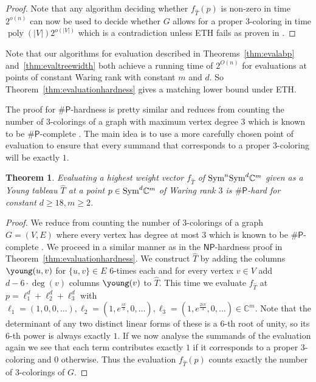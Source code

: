 \documentclass[10pt,a4paper]{article}
\numberwithin{equation}{section}
\newtheorem{theorem}[equation]{Theorem}
\theoremstyle{definition}
\newcommand{\Sym}{\textup{Sym}}
\newcommand{\IC}{\mathbb{C}}
\newcommand{\PP}{\ensuremath{\mathsf{P}}}
\newcommand{\NP}{\ensuremath{\mathsf{NP}}}
\DeclareMathOperator{\poly}{poly}
\begin{document}
\begin{proof}
    Note that any algorithm deciding whether $f_{\hat{T}}(p)$ is non-zero in time $2^{o(n)}$ can now be used to decide whether $G$ allows for a proper $3$-coloring in time $\poly(|V|)2^{o(|V|)}$ which is a contradiction unless ETH fails as proven in \cite{DBLP:journals/jcss/ImpagliazzoPZ01}.
\end{proof}

Note that our algorithms for evaluation described in Theorems~\ref{thm:evalabp} and~\ref{thm:evaltreewidth} both achieve a running time of $2^{O(n)}$ for evaluations at points of constant Waring rank with constant $m$ and $d$.
So Theorem~\ref{thm:evaluationhardness} gives a matching lower bound under ETH.

The proof for $\#\PP$-hardness is pretty similar and reduces from counting the number of $3$-colorings of a graph with maximum vertex degree $3$ which is known to be $\#\PP$-complete \cite{DBLP:journals/siamcomp/BubleyDGJ99}.
The main idea is to use a more carefully chosen point of evaluation to ensure that every summand that corresponds to a proper $3$-coloring will be exactly $1$.

\begin{theorem}
    \label{thm:evaluationsharpphardness}
    Evaluating a highest weight vector $f_{\hat{T}}$ of $\Sym^n\Sym^d \IC^m$ given as a Young tableau $\hat{T}$ at a point $p \in \Sym^d \IC^m$ of Waring rank $3$ is $\#\PP$-hard for constant $d \geq 18, m \geq 2$.
\end{theorem}
\begin{proof}
    We reduce from counting the number of $3$-colorings of a graph $G=(V, E)$ where every vertex has degree at most $3$ which is known to be $\#\PP$-complete \cite{DBLP:journals/siamcomp/BubleyDGJ99}.
    We proceed in a similar manner as in the $\NP$-hardness proof in Theorem~\ref{thm:evaluationhardness}.
    We construct $\hat{T}$ by adding the columns {\scriptsize $\young(u,v)$} for $\{u,v\} \in E$ $6$-times each and for every vertex $v \in V$ add $d-6\cdot\deg(v)$ columns {\scriptsize $\young(v)$} to $\hat{T}$.
    This time we evaluate $f_{\hat{T}}$ at $p = \ell_1^d + \ell_2^d + \ell_3^d$ with $\ell_1 = (1, 0, 0, \ldots), \ell_2 = (1, e^{\frac{i\pi}{3}}, 0, \ldots), \ell_3 = (1, e^{\frac{2i\pi}{3}}, 0, \ldots) \in \IC^m$.
    Note that the determinant of any two distinct linear forms of these is a $6$-th root of unity, so its $6$-th power is always exactly $1$.
    If we now analyse the summands of the evaluation again we see that each term contributes exactly $1$ if it corresponds to a proper $3$-coloring and $0$ otherwise.
    Thus the evaluation $f_{\hat{T}}(p)$ counts exactly the number of $3$-colorings of $G$.
\end{proof}
\end{document}
